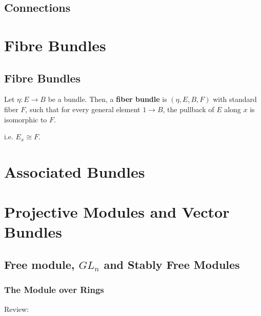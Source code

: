 \documentclass[Total.tex]{subfiles}
\begin{document}
	\section{Connections}
	
	\chapter{Fibre Bundles}
		\section{Fibre Bundles}
			\begin{Def}
				Let $\eta:E\rightarrow B$ be a bundle. Then, a \textbf{fiber bundle} is $(\eta,E,B,F)$ with standard fiber $F$, such that for every general element $1\rightarrow B$, the pullback of $E$ along $x$ is isomorphic to $F$.
				
				i.e. $E_x\cong F$.
			\end{Def}
	\chapter{Associated Bundles}
	\chapter{Projective Modules and Vector Bundles}
	\section{Free module, $GL_n$ and Stably Free Modules}
	
	\subsection{The Module over Rings}
	
	Review:
	
\end{document}
